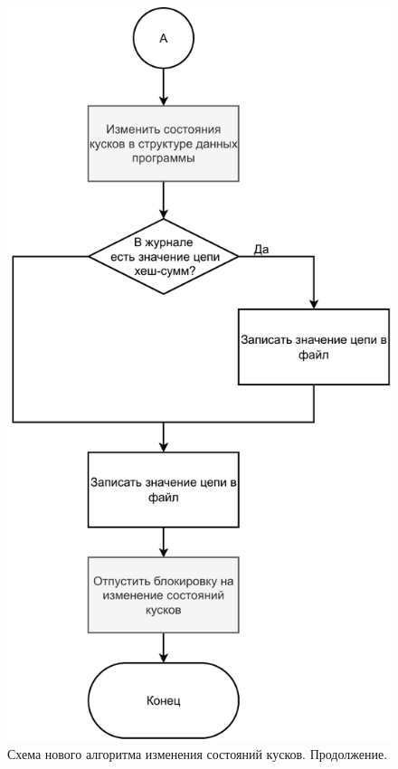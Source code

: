 \begin{figure}[hbtp]
	\centering
	\includegraphics[scale=0.8]{img/mainalgo2.pdf}
	\caption{Схема нового алгоритма изменения состояний кусков. Продолжение.}
	\label{fig:mainalgo2}
\end{figure}

